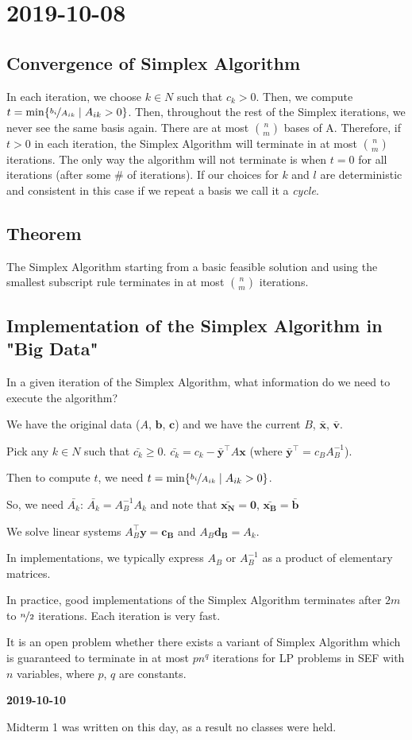 \section{2019-10-08}
\subsection{Convergence of Simplex Algorithm}
In each iteration, we choose $k\in N$ such that $c_k>0$. Then, we compute 
$t=\min\{\nicefrac{b_i}{A_{ik}}\mid A_{ik}>0\}$. Then, throughout the
rest of the Simplex iterations, we never see the same basis again. 
There are at most $\binom{n}{m}$ bases of A. Therefore, if $t>0$ in each iteration,
the Simplex Algorithm will terminate in at most $\binom{n}{m}$ iterations. The only
way the algorithm will not terminate is when $t=0$ for all iterations
(after some \# of iterations). If our choices for $k$ and $l$ are deterministic and
consistent in this case if we repeat a basis we call it a \emph{cycle}.

\subsection{Theorem}
The Simplex Algorithm starting from a basic feasible solution and using the
smallest subscript rule terminates in at most $\binom{n}{m}$ iterations.

\subsection{Implementation of the Simplex Algorithm in "Big Data"}
In a given iteration of the Simplex Algorithm, what information do we need to
execute the algorithm?


We have the original data ($A$, $\mathbf{b}$, $\mathbf{c}$) and we have the
current $B$, $\mathbf{\bar{x}}$, $\mathbf{\bar{v}}$.

Pick any $k\in N$ such that $\bar{c_k}\ge 0$. $\bar{c_k}=c_k-\mathbf{\bar{y}}^\top  A\mathbf{x}$ 
(where $\mathbf{\bar{y}}^\top =c_B A_B^{-1}$).

Then to compute $t$, we need
$t=\min\{\nicefrac{b_i}{A_{ik}}\mid A_{ik}>0\}$.

So, we need
$\bar{A_k}$: $\bar{A_k}=A_B^{-1}A_k$ and note that $\mathbf{\bar{x_N}}=\mathbf{0}$,
$\mathbf{\bar{x_B}}=\mathbf{\bar{b}}$


We solve linear systems $A_B^\top \mathbf{y}=\mathbf{c_B}$ and $A_B\mathbf{d_B}=A_k$.

In implementations, we typically express $A_B$ or $A_B^{-1}$ as a product of elementary
matrices.

In practice, good implementations of the Simplex Algorithm terminates after $2m$ to
$\nicefrac{n}{2}$ iterations. Each iteration is very fast.

It is an open problem whether there exists a variant of Simplex Algorithm which is
guaranteed to terminate in at most $pn^q$ iterations for LP problems in SEF with $n$
variables, where $p$, $q$ are constants.

\textbf{2019-10-10}

Midterm 1 was written on this day, as a result no classes were
held.